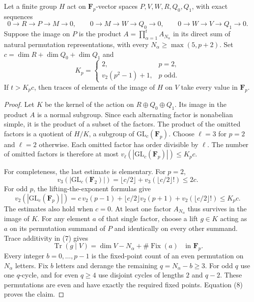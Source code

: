 \begin{lemma}\label{lem:alternating-factor-isolation}
Let a finite group $H$ act on $\mathbf F_p$-vector spaces
$P,V,W,R,Q_0,Q_1$, with exact sequences
\[
 0\to R\to P\to M\to0,\qquad
 0\to M\to W\to Q_0\to0,\qquad
 0\to W\to V\to Q_1\to0.
 \tag{7}
\]
Suppose the image on $P$ is the product
$A=\prod_{\alpha=1}^t A_{N_\alpha}$ in its direct sum
of natural permutation representations, with every
$N_\alpha\geq\max(5,p+2)$.
Set $c=\dim R+\dim Q_0+\dim Q_1$ and
\[
 K_p=
 \begin{cases}
 2,&p=2,\\
 v_2(p^2-1)+1,&p\text{ odd}.
 \end{cases}
\]
If $t>K_pc$, then traces of elements of the image of $H$
on $V$ take every value in $\mathbf F_p$.
\end{lemma}

\begin{proof}
Let $K$ be the kernel of the action on
$R\oplus Q_0\oplus Q_1$.  Its image in the product $A$
is a normal subgroup.  Since each alternating factor is
nonabelian simple, it is the product of a subset of the
factors.  The product of the omitted factors is a quotient
of $H/K$, a subgroup of $\mathrm{GL}_c(\mathbf F_p)$.
Choose $\ell=3$ for $p=2$ and $\ell=2$ otherwise.
Each omitted factor has order divisible by $\ell$.
The number of omitted factors is therefore at most
$v_\ell(|\mathrm{GL}_c(\mathbf F_p)|)\leq K_pc$.

For completeness, the last estimate is elementary.
For $p=2$,
\[
 v_3(|\mathrm{GL}_c(\mathbf F_2)|)
 =\lfloor c/2\rfloor+
             v_3(\lfloor c/2\rfloor!)\leq2c.
\]
For odd $p$, the lifting-the-exponent formulas give
\[
 v_2(|\mathrm{GL}_c(\mathbf F_p)|)
 =c\,v_2(p-1)+\lfloor c/2\rfloor v_2(p+1)
                 +v_2(\lfloor c/2\rfloor!)
 \leq K_pc.
\]
The estimates also hold when $c=0$.
At least one factor $A_{N_\alpha}$ thus survives in the
image of $K$.  For any element $a$ of that single factor,
choose a lift $g\in K$ acting as $a$ on its permutation
summand of $P$ and identically on every other summand.
Trace additivity in (7) gives
\[
 \operatorname{Tr}(g\mid V)
  =\dim V-N_\alpha+\#\operatorname{Fix}(a)
       \quad\text{in }\mathbf F_p.
 \tag{8}
\]
Every integer $b=0,\ldots,p-1$ is the fixed-point count of
an even permutation on $N_\alpha$ letters.  Fix $b$ letters
and derange the remaining $q=N_\alpha-b\geq3$.
For odd $q$ use one $q$-cycle, and for even $q\geq4$ use
disjoint cycles of lengths $2$ and $q-2$.
These permutations are even and have exactly the required
fixed points.  Equation (8) proves the claim.
\end{proof}

